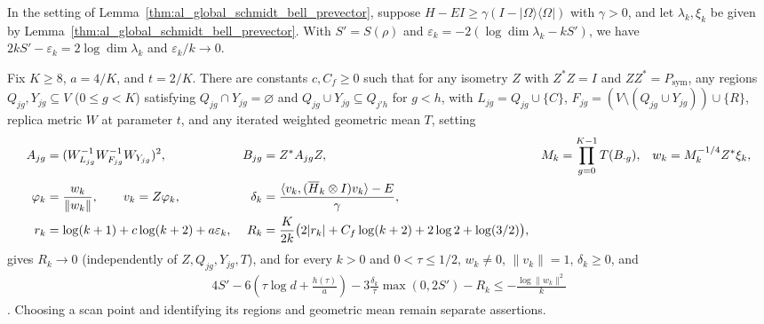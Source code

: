 \begin{lemma}
    \label{thm:al_global_schmidt_bell_rough_lower}
    \leanok
    In the setting of Lemma~\ref{thm:al_global_schmidt_bell_prevector},
    suppose $H-EI\ge\gamma(I-|\Omega\rangle\langle\Omega|)$ with $\gamma>0$, and
    let $\lambda_k,\xi_k$ be given by
    Lemma~\ref{thm:al_global_schmidt_bell_prevector}. With $S'=S(\rho)$ and
    $\varepsilon_k=-2(\log\dim\lambda_k-kS')$, we have
    $2kS'-\varepsilon_k=2\log\dim\lambda_k$ and $\varepsilon_k/k\to0$.

    Fix $K\ge8$, $a=4/K$, and $t=2/K$. There are constants $c,C_f\ge0$ such that
    for any isometry $Z$ with $Z^*Z=I$ and $ZZ^*=P_{\mathrm{sym}}$, any regions
    $Q_{jg},Y_{jg}\subseteq V$ ($0\le g<K$) satisfying
    $Q_{jg}\cap Y_{jg}=\varnothing$ and $Q_{jg}\cup Y_{jg}\subseteq Q_{j'h}$ for
    $g<h$, with $L_{jg}=Q_{jg}\cup\{C\}$,
    $F_{jg}=(V\setminus(Q_{jg}\cup Y_{jg}))\cup\{R\}$, replica metric $W$ at
    parameter $t$, and any iterated weighted geometric mean $T$, setting
    \begin{align}
        A_{jg}    & =(W_{L_{jg}}^{-1}W_{F_{jg}}^{-1}W_{Y_{jg}})^2,
                  & B_{jg}                                         & =Z^*A_{jg}Z,
                  & M_k                                            & =\prod_{g=0}^{K-1}T(B_{\cdot g}),
                  & w_k                                            & =M_k^{-1/4}Z^*\xi_k,
        \label{eq:al_rough_lower_ops}                                                                                                  \\
        \varphi_k & =\frac{w_k}{\|w_k\|},\qquad v_k=Z\varphi_k,
                  & \delta_k                                       & =\frac{\langle v_k,(\overline H_k\otimes I)v_k\rangle-E}{\gamma},
        \notag                                                                                                                         \\
        r_k       & =\log(k+1)+c\log(k+2)+a\varepsilon_k,
                  & R_k                                            & =\frac K{2k}\bigl(2|r_k|+C_f\log(k+2)+2\log2+\log(3/2)\bigr),
        \label{eq:al_rough_lower_remainder}
    \end{align}
    gives $R_k\to0$ (independently of $Z,Q_{jg},Y_{jg},T$), and for every $k>0$
    and $0<\tau\le1/2$, $w_k\ne0$, $\|v_k\|=1$, $\delta_k\ge0$, and
    \begin{align}
        4S'-6\left(\tau\log d+\frac{h(\tau)}a\right)
        -3\frac{\delta_k}{\tau}\max(0,2S')-R_k
        \le-\frac{\log\|w_k\|^2}{k}
        \label{eq:al_rough_lower_bound}
    \end{align}
    \cite[Section~8]{OpenAI2026AreaLaw}. Choosing a scan point and identifying
    its regions and geometric mean remain separate assertions.
\end{lemma}
